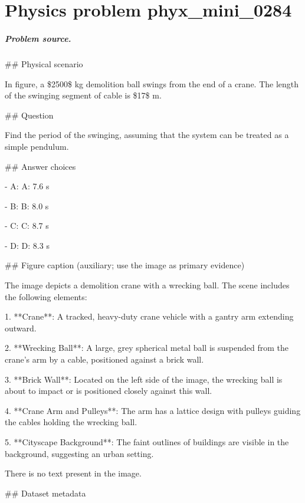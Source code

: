 
\chapter{Physics problem phyx\_mini\_0284}
\label{ch:PhyXMiniProblems_problem_phyx_mini_0284}

\paragraph{Problem source.}
\#\# Physical scenario

In figure, a \$2500\$ kg demolition ball swings from the end of a crane. The length of the swinging segment of cable is \$17\$ m.

\#\# Question

Find the period of the swinging, assuming that the system can be treated as a simple pendulum.

\#\# Answer choices

- A: A: 7.6 s

- B: B: 8.0 s

- C: C: 8.7 s

- D: D: 8.3 s

\#\# Figure caption (auxiliary; use the image as primary evidence)

The image depicts a demolition crane with a wrecking ball. The scene includes the following elements:

1. **Crane**: A tracked, heavy-duty crane vehicle with a gantry arm extending outward.
   
2. **Wrecking Ball**: A large, grey spherical metal ball is suspended from the crane's arm by a cable, positioned against a brick wall.

3. **Brick Wall**: Located on the left side of the image, the wrecking ball is about to impact or is positioned closely against this wall.

4. **Crane Arm and Pulleys**: The arm has a lattice design with pulleys guiding the cables holding the wrecking ball.

5. **Cityscape Background**: The faint outlines of buildings are visible in the background, suggesting an urban setting.

There is no text present in the image.

\#\# Dataset metadata

